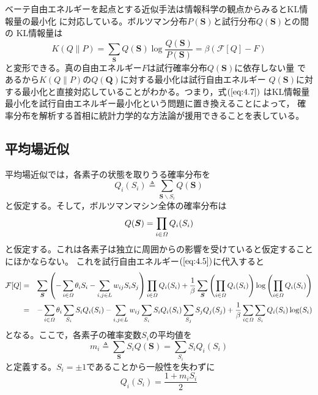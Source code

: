 ベーテ自由エネルギーを起点とする近似手法は情報科学の観点からみるとKL情報量の最小化
に対応している。ボルツマン分布$P(\bm{S})$と試行分布$Q(\bm{S})$との間の
KL情報量は
\begin{equation}
K(Q\parallel P)=\sum_{\bm{S}}Q(\bm{S})\log\frac{Q(\bm{S})}{P(\bm{S})}
=\beta(\mathcal{F}[Q]-F)\label{eq:4.7}
\end{equation}
と変形できる。真の自由エネルギー$F$は試行確率分布$Q(\bm{S})$に依存しない量
であるから$K(Q\parallel P)$の$Q(\bm{Q})$に対する最小化は試行自由エネルギー
$Q(\bm{S})$に対する最小化と直接対応していることがわかる。つまり，式$(\ref{eq:4.7})$
はKL情報量最小化を試行自由エネルギー最小化という問題に置き換えることによって，
確率分布を解析する首相に統計力学的な方法論が援用できることを表している。
\subsection{平均場近似}
平均場近似では，各素子の状態を取りうる確率分布を
\begin{equation}
Q_{i}(S_{i})\triangleq\sum_{\bm{S}\backslash S_{i}}Q(\bm{S})\nonumber
\end{equation}
と仮定する。そして，ボルツマンマシン全体の確率分布は
\begin{equation}
Q(\bm{S})=\prod_{i\in\mathit{\Omega}}Q_{i}(S_{i})\label{eq:4.8}
\end{equation}
と仮定する。これは各素子は独立に周囲からの影響を受けていると仮定することにほかならない。
これを試行自由エネルギー$(\ref{eq:4.5})$に代入すると
\begin{eqnarray}
\mathcal{F}[Q]&=&\sum_{\bm{S}}\left(-\sum_{i\in\mathit{\Omega}}\theta_{i}S_{i}
-\sum_{i,j\in L}w_{ij}S_{i}S_{j}\right)\prod_{i\in\mathit{\Omega}}
Q_{i}(S_{i})+\frac{1}{\beta}\sum_{\bm{S}}
\left(\prod_{i\in\mathit{\Omega}}Q_{i}(S_{i})\right)
\log\left(\prod_{i\in\mathit{\Omega}}Q_{i}(S_{i})\right)\nonumber\\
&=&-\sum_{i\in\mathit{\Omega}}\theta_{i}\sum_{S_{i}}S_{i}Q_{i}(S_{i})-
\sum_{i,j\in L}w_{ij}\sum_{S_{i}}S_{i}Q_{i}(S_{i})
\sum_{S_{j}}S_{j}Q_{j}(S_{j})
+\frac{1}{\beta}\sum_{i\in\mathit{\Omega}}\sum_{S_{i}}Q_{i}(S_{i})\log(S_{i})
\label{eq:4.9}
\end{eqnarray}
となる。ここで，各素子の確率変数$S_{i}$の平均値を
\begin{equation}
m_{i}\triangleq\sum_{\bm{S}}S_{i}Q(\bm{S})=\sum_{S_{i}}S_{i}Q_{i}(S_{i})
\label{eq:4.10}
\end{equation}
と定義する。$S_{i}=\pm 1$であることから一般性を失わずに
\begin{equation}
Q_{i}(S_{i})=\frac{1+m_{i}S_{i}}{2}\label{eq:4.11}
\end{equation}

